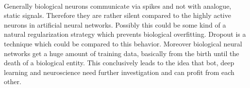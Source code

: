 \documentclass[12pt,twoside]{article}
\theoremstyle{plain}
\theoremstyle{definition}
\theoremstyle{remark}
\begin{document}
\\
Generally biological neurons communicate via spikes and not with analogue, static signals. Therefore they are rather silent compared to the highly active neurons in artificial neural networks. Possibly this could be some kind of a natural regularization strategy which prevents biological overfitting. Dropout \cite{ImprovingNeuralNetworksDropout-Hinton-Krizhevsky} is a technique which could be compared to this behavior. Moreover biological neural networks get a huge amount of training data, basically from the birth until the death of a biological entity. This conclusively leads to the idea that bot, deep learning and neuroscience need further investigation and can profit from each other.




%
%
\newpage


\end{document}
